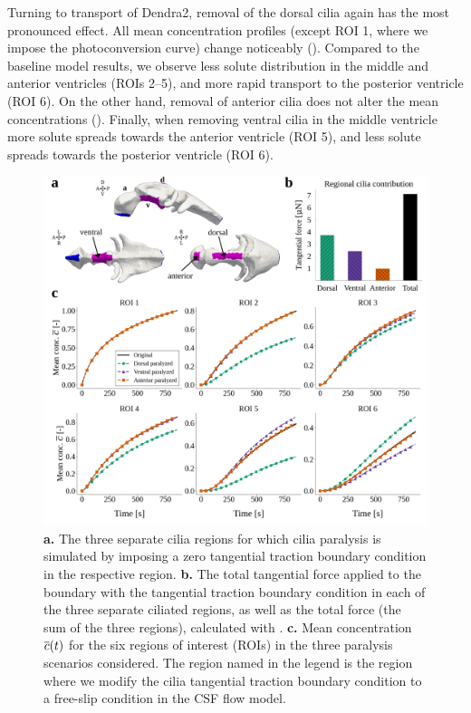 \documentclass{WileyMSP-template}
\begin{document}
Turning to transport of Dendra2, removal of the
dorsal cilia again has the most pronounced effect. All mean concentration
profiles (except ROI 1, where we impose the photoconversion curve)
change noticeably (). Compared to the baseline
model results, we observe less solute distribution in the middle and
anterior ventricles (ROIs 2--5), and more rapid transport to the
posterior ventricle (ROI 6). On the other hand, removal of anterior
cilia does not alter the mean concentrations
(). Finally, when removing ventral cilia in the
middle ventricle more solute spreads towards the anterior ventricle
(ROI 5), and less solute spreads towards the posterior ventricle (ROI 6).
\begin{figure}[H]
    \centering
    \includegraphics[width=\textwidth]{graphics/figure5_compare_cilia_modifications.png}
    \caption{\textbf{a.} The three separate cilia regions for which cilia paralysis is simulated
    by imposing a zero tangential traction boundary condition in the respective region.
    \textbf{b.} The total tangential force applied to the boundary with the tangential traction
    boundary condition in each of the three separate ciliated regions, as well as the total force
    (the sum of the three regions), calculated with . 
    \textbf{c.} Mean concentration $\overline{c}(t)$ for the six regions of interest (ROIs) in the three 
    paralysis scenarios considered. The region named in the legend is the region
    where we modify the cilia tangential traction boundary condition to a free-slip condition
    in the CSF flow model.}
    \label{fig:fig5}
\end{figure}
\end{document}
